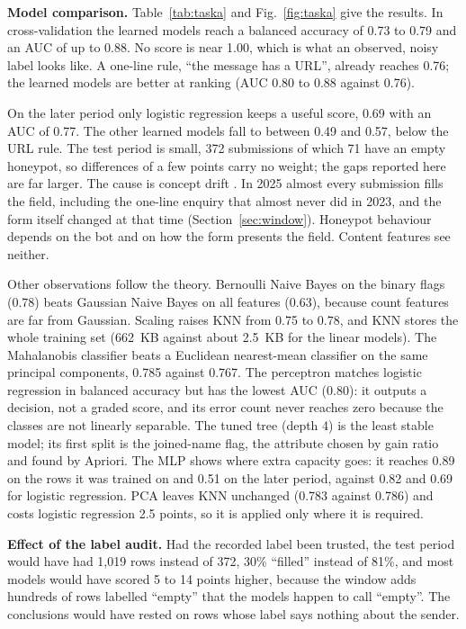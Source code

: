 \documentclass[conference]{IEEEtran}
\begin{document}
\textbf{Model comparison.} Table~\ref{tab:taska} and Fig.~\ref{fig:taska} give the results. In
cross-validation the learned models reach a balanced accuracy of 0.73 to 0.79 and an AUC of up to 0.88. No
score is near 1.00, which is what an observed, noisy label looks like. A one-line rule, ``the message has a
URL'', already reaches 0.76; the learned models are better at ranking (AUC 0.80 to 0.88 against 0.76).

On the later period only logistic regression keeps a useful score, 0.69 with an AUC of 0.77. The other learned
models fall to between 0.49 and 0.57, below the URL rule. The test period is small, 372 submissions of which 71
have an empty honeypot, so differences of a few points carry no weight; the gaps reported here are far larger.
The cause is concept drift \cite{gama2014}. In 2025 almost every submission fills the field, including the
one-line enquiry that almost never did in 2023, and the form itself changed at that time
(Section~\ref{sec:window}). Honeypot behaviour depends on the bot and on how the form presents the field.
Content features see neither.

Other observations follow the theory. Bernoulli Naive Bayes on the binary flags (0.78) beats Gaussian Naive
Bayes on all features (0.63), because count features are far from Gaussian. Scaling raises KNN from 0.75 to
0.78, and KNN stores the whole training set (662~KB against about 2.5~KB for the linear models). The
Mahalanobis classifier beats a Euclidean nearest-mean classifier on the same principal components, 0.785
against 0.767. The perceptron matches logistic regression in balanced accuracy but has the lowest AUC (0.80):
it outputs a decision, not a graded score, and its error count never reaches zero because the classes are not
linearly separable. The tuned tree (depth 4) is the least stable model; its first split is the joined-name
flag, the attribute chosen by gain ratio and found by Apriori. The MLP shows where extra capacity goes: it
reaches 0.89 on the rows it was trained on and 0.51 on the later period, against 0.82 and 0.69 for logistic
regression. PCA leaves KNN unchanged (0.783 against 0.786) and costs logistic regression 2.5 points, so it is
applied only where it is required.

\textbf{Effect of the label audit.} Had the recorded label been trusted, the test period would have had 1,019
rows instead of 372, 30\% ``filled'' instead of 81\%, and most models would have scored 5 to 14 points higher,
because the window adds hundreds of rows labelled ``empty'' that the models happen to call ``empty''. The
conclusions would have rested on rows whose label says nothing about the sender.
\end{document}
